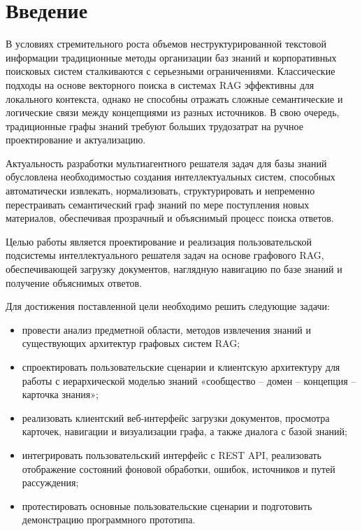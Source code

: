 \section*{Введение}

В условиях стремительного роста объемов неструктурированной текстовой информации традиционные методы организации баз знаний и корпоративных поисковых систем сталкиваются с серьезными ограничениями. Классические подходы на основе векторного поиска в системах RAG эффективны для локального контекста, однако не способны отражать сложные семантические и логические связи между концепциями из разных источников. В свою очередь, традиционные графы знаний требуют больших трудозатрат на ручное проектирование и актуализацию. 

Актуальность разработки мультиагентного решателя задач для базы знаний обусловлена необходимостью создания интеллектуальных систем, способных автоматически извлекать, нормализовать, структурировать и непременно перестраивать семантический граф знаний по мере поступления новых материалов, обеспечивая прозрачный и объяснимый процесс поиска ответов.

Целью работы является проектирование и реализация пользовательской подсистемы интеллектуального решателя задач на основе графового RAG, обеспечивающей загрузку документов, наглядную навигацию по базе знаний и получение объяснимых ответов.

Для достижения поставленной цели необходимо решить следующие задачи:
\begin{itemize}
    \item провести анализ предметной области, методов извлечения знаний и существующих архитектур графовых систем RAG;
    \item спроектировать пользовательские сценарии и клиентскую архитектуру для работы с иерархической моделью знаний «сообщество -- домен -- концепция -- карточка знания»;
    \item реализовать клиентский веб-интерфейс загрузки документов, просмотра карточек, навигации и визуализации графа, а также диалога с базой знаний;
    \item интегрировать пользовательский интерфейс с REST API, реализовать отображение состояний фоновой обработки, ошибок, источников и путей рассуждения;
    \item протестировать основные пользовательские сценарии и подготовить демонстрацию программного прототипа.
\end{itemize}

